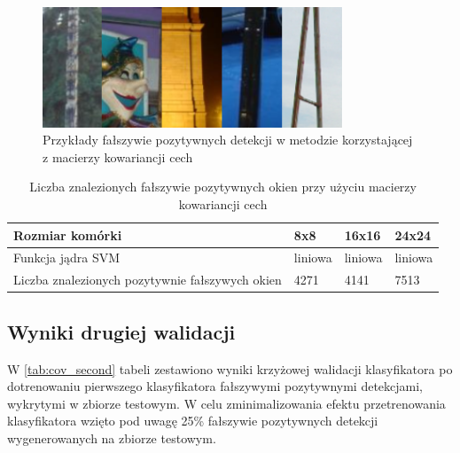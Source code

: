 \begin{figure}[htb]
\centering
\includegraphics[width=0.8\textwidth]{cov_fps.png}
\caption{Przykłady fałszywie pozytywnych detekcji w metodzie korzystającej z macierzy kowariancji cech}
\label{fig:fp_cov}
\end{figure}

\begin{center}
    \begin{longtable}{ | p{5cm} | p{3cm} | p{3cm} | p{3cm} |}
    \caption{Liczba znalezionych fałszywie pozytywnych okien przy użyciu macierzy kowariancji cech} \\
    \hline
	Rozmiar komórki & 8x8 & 16x16 & 24x24 \\ \hline
	Funkcja jądra SVM & liniowa & liniowa & liniowa  \\ \hline
    Liczba znalezionych pozytywnie fałszywych okien & 4271 & 4141 & 7513 \\ \hline
    \end{longtable}
    \label{tab:fp_cov}
\end{center}

\subsection{Wyniki drugiej walidacji}

W \ref{tab:cov_second} tabeli zestawiono wyniki krzyżowej walidacji klasyfikatora po dotrenowaniu pierwszego klasyfikatora fałszywymi pozytywnymi detekcjami, wykrytymi w zbiorze testowym. W celu zminimalizowania efektu przetrenowania klasyfikatora wzięto pod uwagę 25\% fałszywie pozytywnych detekcji wygenerowanych na zbiorze testowym.

